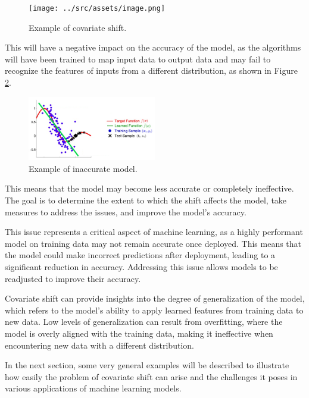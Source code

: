 \vspace{0.5cm}  
\begin{figure}[h!]
    \centering
    \texttt{[image: ../src/assets/image.png]} 
    \caption{Example of covariate shift.}
    \label{fig:example}
\end{figure}

This will have a negative impact on the accuracy of the model, as the algorithms will have been trained to map input data to output data and may fail to recognize the features of inputs from a different distribution, as shown in Figure \cref{inaccurate-model}.  

\begin{figure}[h!]
    \centering
    \includegraphics[width=0.5\textwidth]{../src/assets/covariate_shift.png} 
    \caption{Example of inaccurate model.}
    \label{inaccurate-model}
\end{figure}  

This means that the model may become less accurate or completely ineffective. The goal is to determine the extent to which the shift affects the model, take measures to address the issues, and improve the model's accuracy.

This issue represents a critical aspect of machine learning, as a highly performant model on training data may not remain accurate once deployed. This means that the model could make incorrect predictions after deployment, leading to a significant reduction in accuracy. Addressing this issue allows models to be readjusted to improve their accuracy.  

Covariate shift can provide insights into the degree of generalization of the model, which refers to the model's ability to apply learned features from training data to new data. Low levels of generalization can result from overfitting, where the model is overly aligned with the training data, making it ineffective when encountering new data with a different distribution.  

In the next section, some very general examples will be described to illustrate how easily the problem of covariate shift can arise and the challenges it poses in various applications of machine learning models.


